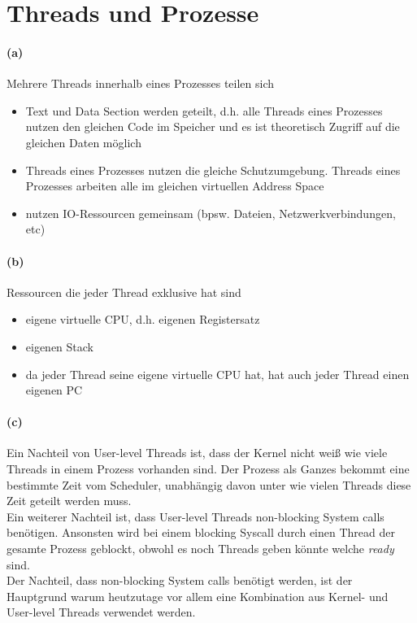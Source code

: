 \documentclass[a4paper]{article}
\begin{document}
\newpage
\section{Threads und Prozesse}
\paragraph{(a)}
Mehrere Threads innerhalb eines Prozesses teilen sich
\begin{itemize}
    \item Text und Data Section werden geteilt, d.h. alle Threads eines Prozesses nutzen den gleichen Code im Speicher und es ist theoretisch Zugriff auf die gleichen Daten möglich
    \item Threads eines Prozesses nutzen die gleiche Schutzumgebung. Threads eines Prozesses arbeiten alle im gleichen virtuellen Address Space
    \item nutzen IO-Ressourcen gemeinsam (bpsw. Dateien, Netzwerkverbindungen, etc)
\end{itemize}

\paragraph{(b)}
Ressourcen die jeder Thread exklusive hat sind

\begin{itemize}
    \item eigene virtuelle CPU, d.h. eigenen Registersatz
    \item eigenen Stack
    \item da jeder Thread seine eigene virtuelle CPU hat, hat auch jeder Thread einen eigenen PC
\end{itemize}

\paragraph{(c)}
Ein Nachteil von User-level Threads ist, dass der Kernel nicht weiß wie viele Threads in einem Prozess vorhanden sind. Der Prozess als Ganzes bekommt eine bestimmte Zeit vom Scheduler, unabhängig davon unter wie vielen Threads diese Zeit geteilt werden muss.\\
Ein weiterer Nachteil ist, dass User-level Threads non-blocking System calls benötigen. Ansonsten wird bei einem blocking Syscall durch einen Thread der gesamte Prozess geblockt, obwohl es noch Threads geben könnte welche \textit{ready} sind.\\
Der Nachteil, dass non-blocking System calls benötigt werden, ist der Hauptgrund warum heutzutage vor allem eine Kombination aus Kernel- und User-level Threads verwendet werden.
\end{document}
